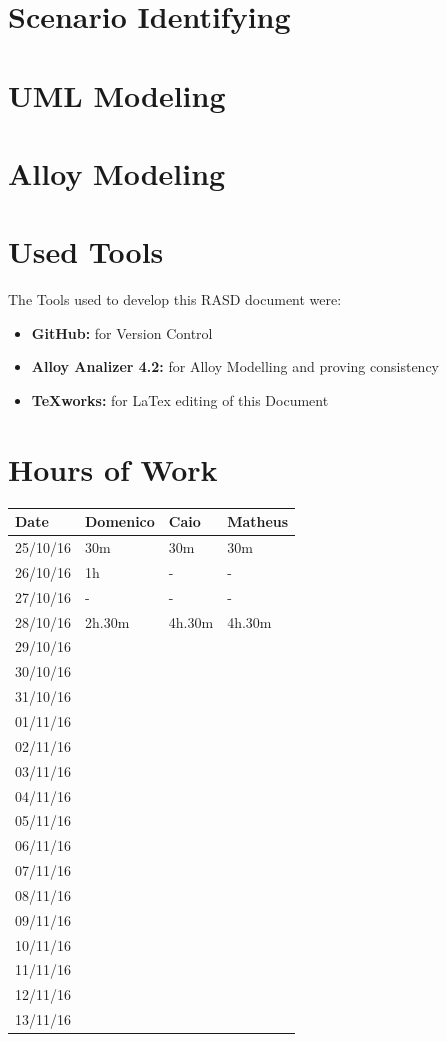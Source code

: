 \documentclass[a4paper]{article}
\begin{document}
\section{Scenario Identifying}

\section{UML Modeling}

\section{Alloy Modeling}
\newpage

\section{Used Tools}
The Tools used to develop this RASD document were:
\begin{itemize}
	\item \textbf{GitHub:} for Version Control
	\item \textbf{Alloy Analizer 4.2:} for Alloy Modelling and proving consistency 
	\item \textbf {TeXworks:} for LaTex editing of this Document
\end{itemize}
\newpage

\section{Hours of Work}
\begin{tabular}{ | l | l | l | l | }
\hline
	\textbf {Date} & \textbf {Domenico} & \textbf {Caio} & \textbf {Matheus} \\ \hline
	25/10/16& 30m & 30m & 30m \\ \hline
	26/10/16& 1h & -  & -  \\ \hline
	27/10/16&  - & - & -  \\ \hline
	28/10/16& 2h.30m & 4h.30m & 4h.30m \\ \hline
	29/10/16&  &  &  \\ \hline
	30/10/16&  &  &  \\ \hline
	31/10/16&  &  &  \\ \hline
	01/11/16&  &  &  \\ \hline
	02/11/16&  &  &  \\ \hline
	03/11/16&  &  &  \\ \hline
	04/11/16&  &  &  \\ \hline
	05/11/16&  &  &  \\ \hline
	06/11/16&  &  &  \\ \hline
	07/11/16&  &  &  \\ \hline
	08/11/16&  &  &  \\ \hline
	09/11/16&  &  &  \\ \hline
	10/11/16&  &  &  \\ \hline
	11/11/16&  &  &  \\ \hline
	12/11/16&  &  &  \\ \hline
	13/11/16&  &  &  \\ \hline
\end{tabular}

\newpage
\end{document}
